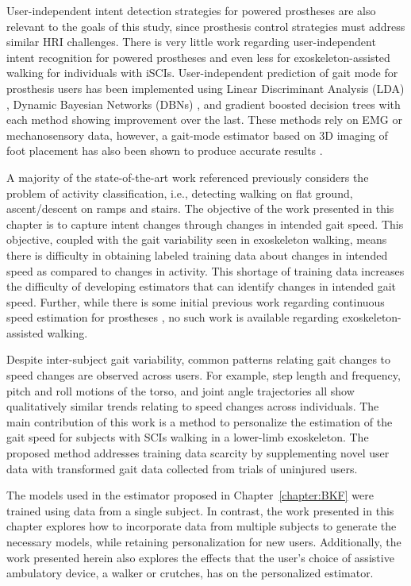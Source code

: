 User-independent intent detection strategies for powered prostheses are also relevant to the goals of this study, since prosthesis control strategies must address similar HRI challenges. There is very little work regarding user-independent intent recognition for powered prostheses and even less for exoskeleton-assisted walking for individuals with iSCIs. User-independent prediction of gait mode for prosthesis users has been implemented using Linear Discriminant Analysis (LDA) \cite{young2013classifying}, Dynamic Bayesian Networks (DBNs) \cite{young2015classification}, and gradient boosted decision trees \cite{bhakta2020machine} with each method showing improvement over the last. These methods rely on EMG or mechanosensory data, however, a gait-mode estimator based on 3D imaging of foot placement has also been shown to produce accurate results \cite{massalin2017user}. 

A majority of the state-of-the-art work referenced previously considers the problem of activity classification, i.e., detecting walking on flat ground, ascent/descent on ramps and stairs. The objective of the work presented in this chapter is to capture intent changes through changes in intended gait speed. This objective, coupled with the gait variability seen in exoskeleton walking, means there is difficulty in obtaining labeled training data about changes in intended speed as compared to changes in activity. This shortage of training data increases the difficulty of developing estimators that can identify changes in intended gait speed. Further, while there is some initial previous work regarding continuous speed estimation for prostheses \cite{best2021phase}, no such work is available regarding exoskeleton-assisted walking.

Despite inter-subject gait variability, common patterns relating gait changes to speed changes are observed across users. For example, step length and frequency, pitch and roll motions of the torso, and joint angle trajectories all show qualitatively similar trends relating to speed changes across individuals. The main contribution of this work is a method to personalize the estimation of the gait speed for subjects with SCIs walking in a lower-limb exoskeleton. The proposed method addresses training data scarcity by supplementing novel user data with transformed gait data collected from trials of uninjured users. 

The models used in the estimator proposed in Chapter~\ref{chapter:BKF} were trained using data from a single subject. In contrast, the work presented in this chapter explores how to incorporate data from multiple subjects to generate the necessary models, while retaining personalization for new users. Additionally, the work presented herein also explores the effects that the user's choice of assistive ambulatory device, a walker or crutches, has on the personalized estimator.

